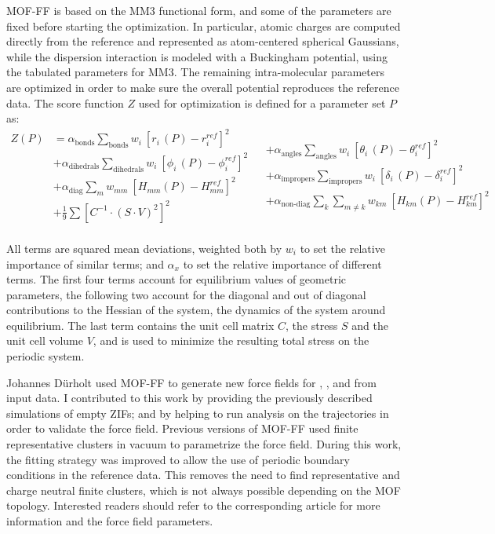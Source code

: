 \documentclass[thesis]{subfiles}
\begin{document}
MOF-FF is based on the MM3 functional form\cite{Allinger1989}, and some of the
parameters are fixed before starting the optimization. In particular, atomic
charges are computed directly from the \abinitio reference and represented as
atom-centered spherical Gaussians, while the dispersion interaction is modeled
with a Buckingham potential, using the tabulated parameters for
MM3\cite{Allinger1994}. The remaining intra-molecular parameters are optimized
in order to make sure the overall potential reproduces the reference data. The
score function $Z$ used for optimization is defined for a parameter set $P$ as:
\[
\begin{aligned}
    Z(P) &= \alpha_\text{bonds} \sum_\text{bonds} w_i \ \left[r_i\,(P) - r_i^{ref}\right]^2 \\
         &+ \alpha_\text{dihedrals} \sum_\text{dihedrals} w_i \ \left[\phi_i\,(P) - \phi_i^{ref}\right]^2 \\
         &+ \alpha_\text{diag} \sum_m w_{mm} \ \left[H_{mm}(P) - H_{mm}^{ref}\right]^2 \\
         &+ \frac 1 9 \sum \left[C^{-1} \cdot (S \cdot V)^2\right]^2 \\
\end{aligned}
\begin{aligned}
    &+ \alpha_\text{angles} \sum_\text{angles} w_i \ \left[\theta_i\,(P) - \theta_i^{ref}\right]^2 \\
    &+ \alpha_\text{impropers} \sum_\text{impropers} w_i \ \left[\delta_i\,(P) - \delta_i^{ref}\right]^2 \\
    &+ \alpha_\text{non-diag} \sum_k \sum_{m\neq k} w_{km} \ \left[H_{km}(P) - H_{km}^{ref}\right]^2 \\
    &~
\end{aligned}
\]

All terms are squared mean deviations, weighted both by $w_i$ to set the relative
importance of similar terms; and $\alpha_x$ to set the relative importance of
different terms. The first four terms account for equilibrium values of
geometric parameters, the following two account for the diagonal and out of
diagonal contributions to the Hessian of the system, \ie the dynamics of the
system around equilibrium. The last term contains the unit cell matrix $C$, the
stress $S$ and the unit cell volume $V$, and is used to minimize the resulting
total stress on the periodic system.

Johannes Dürholt used MOF-FF to generate new force fields for , \ZIFCl,
and \ZIFBr from \abinitio input data. I contributed to this work by providing
the previously described simulations of empty ZIFs; and by helping to run
analysis on the trajectories in order to validate the force field. Previous
versions of MOF-FF used finite representative clusters in vacuum to parametrize
the force field. During this work, the fitting strategy was improved to allow
the use of periodic boundary conditions in the reference data. This removes the
need to find representative and charge neutral finite clusters, which is not
always possible depending on the MOF topology. Interested readers should refer to
the corresponding article\cite{Duerholt2019} for more information and the force
field parameters.
\end{document}
